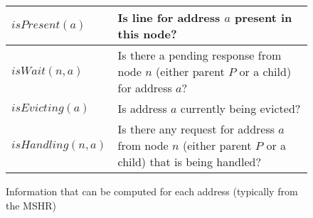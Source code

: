 \begin{figure}\centering
\begin{tabularx}{\linewidth}{|l|X|}
\hline
$isPresent(a)$ & Is line for address $a$ present in this node?\\
\hline
$isWait(n, a)$ & Is there a pending response from node $n$ (either parent $P$
or a child) for address $a$?\\
\hline
$isEvicting(a)$ & Is address $a$ currently being evicted?\\
\hline
$isHandling(n, a)$ & Is there any request for address $a$ from node $n$ (either
parent $P$ or a child) that is being handled?\\
\hline
\end{tabularx}
\caption{Information that can be computed for each address (typically from the
MSHR)}
\label{table:functions}
\end{figure}

